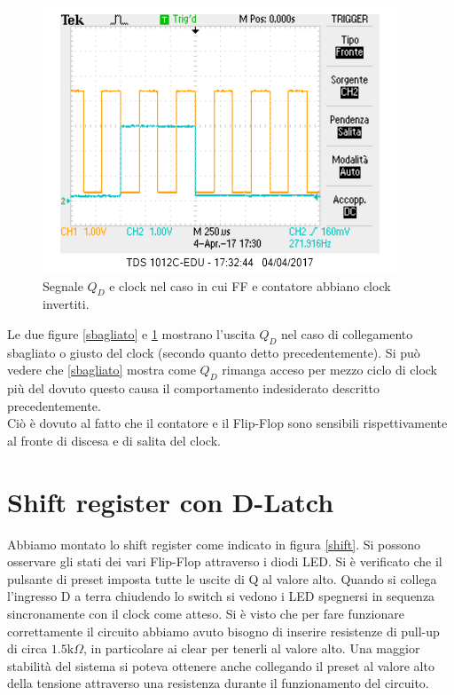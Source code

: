 \documentclass[10pt,a4paper]{article}
\begin{document}
\begin{figure}[!htb]
\centering
\includegraphics[scale=1.0]{clockgiusto.png}
\caption{Segnale $Q_D$ e clock nel caso in cui FF e contatore abbiano clock invertiti.\label{giusto}}
\end{figure}

Le due figure \ref{sbagliato} e \ref{giusto} mostrano l'uscita $Q_D$ nel caso di collegamento sbagliato o giusto del clock (secondo quanto detto precedentemente). Si può vedere che \ref{sbagliato} mostra come $Q_D$ rimanga acceso per mezzo ciclo di clock più del dovuto questo causa il comportamento indesiderato descritto precedentemente.\\
Ciò è dovuto al fatto che il contatore e il Flip-Flop sono sensibili rispettivamente al fronte di discesa e di salita del clock.\\

\section{Shift register con D-Latch}
Abbiamo montato lo shift register come indicato in figura \ref{shift}. Si possono osservare gli stati dei vari Flip-Flop attraverso i diodi LED. Si è verificato che il pulsante di preset imposta tutte le uscite di Q al valore alto. Quando si collega l'ingresso D a terra chiudendo lo switch si vedono i LED spegnersi in sequenza sincronamente con il clock come atteso. Si è visto che per fare funzionare correttamente il circuito abbiamo avuto bisogno di inserire resistenze di pull-up di circa $1.5 \mbox{k}\Omega$, in particolare ai clear per tenerli al valore alto. Una maggior stabilità del sistema si poteva ottenere anche collegando il preset al valore alto della tensione attraverso una resistenza durante il funzionamento del circuito.
\end{document}
